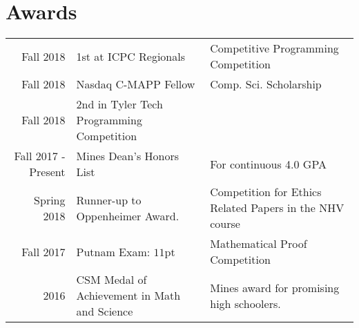 \documentclass[]{deedy-resume-openfont}
\begin{document}
\begin{minipage}[t]{0.55\textwidth}

%
%

\end{minipage} 


\section{Awards} 
\begin{tabular}{rll}
Fall 2018 & 1st at ICPC Regionals & Competitive Programming Competition \\
Fall 2018 & Nasdaq C-MAPP Fellow & Comp. Sci. Scholarship \\
Fall 2018 & 2nd in Tyler Tech Programming Competition & \\
Fall 2017 - Present & Mines Dean's Honors List & For continuous 4.0 GPA \\
Spring 2018 & Runner-up to Oppenheimer Award. & Competition for Ethics Related Papers in the NHV course \\
Fall 2017 & Putnam Exam: \(11\)pt & Mathematical Proof Competition \\
2016	     & CSM Medal of Achievement in Math and Science & Mines award for promising high schoolers. \\
\end{tabular}
\end{document}
